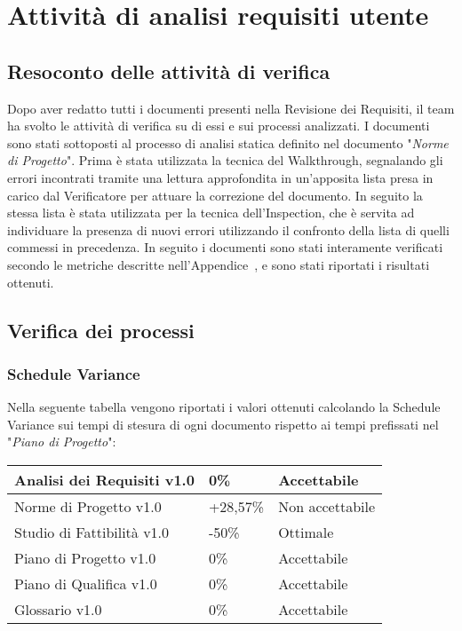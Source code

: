 \newpage
\section{Attività di analisi requisiti utente}
\subsection{Resoconto delle attività di verifica}

Dopo aver redatto tutti i documenti presenti nella Revisione dei Requisiti, il team ha svolto le attività di verifica su di essi e sui processi analizzati. I documenti sono stati sottoposti al processo di analisi statica definito nel documento "\textit{Norme di Progetto}".
Prima è stata utilizzata la tecnica del Walkthrough, segnalando gli errori incontrati tramite una lettura approfondita in un'apposita lista presa in carico dal Verificatore per attuare la correzione del documento. In seguito la stessa lista è stata utilizzata per la tecnica dell'Inspection, che è servita ad individuare la presenza di nuovi errori utilizzando il confronto della lista di quelli commessi in precedenza.
In seguito i documenti sono stati interamente verificati secondo le metriche descritte nell'Appendice~, e sono stati riportati i risultati ottenuti.

\subsection{Verifica dei processi}
\subsubsection{Schedule Variance}
Nella seguente tabella vengono riportati i valori ottenuti calcolando la Schedule Variance sui tempi di stesura di ogni documento rispetto ai tempi prefissati nel "\textit{Piano di Progetto}":

{
	\renewcommand{\arraystretch}{2}
	\centering
	\begin{tabular}{| L{4cm} | R{0.5cm} | C{3cm} |}
	\hline
	Analisi dei Requisiti v1.0 & 0\% & Accettabile \\
	\hline
	Norme di Progetto v1.0 & +28,57\% & Non accettabile \\
	\hline
	Studio di Fattibilità v1.0 &  -50\% &  Ottimale \\
	\hline
	Piano di Progetto v1.0 &  0\% &  Accettabile\\
	\hline
	Piano di Qualifica v1.0 & 0\% & Accettabile \\
	\hline
	Glossario v1.0 & 0\% & Accettabile\\	
	\hline
	\end{tabular}
	
}


